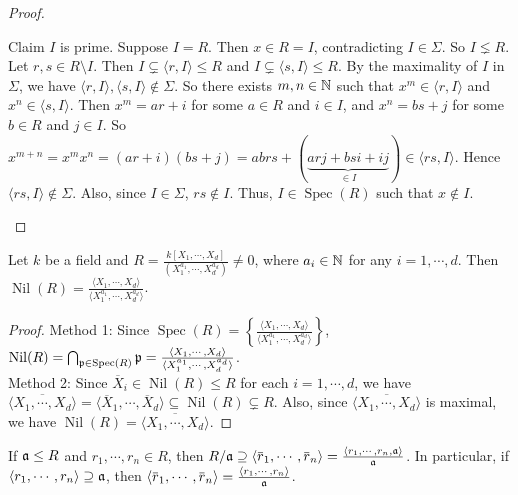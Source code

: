 \begin{proof}
\begin{enumerate}[(a)]
            Claim $I$ is prime. Suppose $I = R$. Then $x \in R = I$, contradicting $I \in \Sigma$. So $I \lneq R$. Let $r,s \in R \setminus I$. Then $I \subsetneq \langle r,I \rangle \leq R$ and $I \subsetneq \langle s,I \rangle \leq R$. By the maximality of $I$ in $\Sigma$, we have $\langle r,I \rangle, \langle s,I \rangle \not \in \Sigma$. So there exists $m,n \in \mathbb{N}$ such that $x^m \in \langle r,I \rangle$ and $x^n \in \langle s,I \rangle$. Then $x^m = ar+i$ for some $a \in R$ and $i \in I$, and $x^n = bs + j$ for some $b \in R$ and $j \in I$. So $x^{m+n} = x^m x^n = (ar+i)(bs+j) = abrs + (\underbrace{arj+bsi+ij}_{\in I}) \in \langle rs,I \rangle$. Hence $\langle rs, I \rangle \not\in \Sigma$. Also, since $I \in \Sigma$, $rs \not \in I$. Thus, $I \in \operatorname{Spec}(R)$ such that $x \not \in I$.
    \end{enumerate}
\end{proof}

\begin{example*}
    Let $k$ be a field and $R = \frac{k[X_1,\cdots,X_d]}{(X_1^{a_1},\cdots,X_d^{a_d})} \neq 0$, where $a_i \in \mathbb{N}$ for any $i = 1,\cdots,d$. Then $\operatorname{Nil}(R) = \frac{\langle X_1,\cdots,X_d \rangle}{\langle X_1^{a_1},\cdots,X_d^{a_d} \rangle}$.
\end{example*}

\begin{proof}
    Method 1: Since $\operatorname{Spec}(R) = \left\{\frac{\langle X_1,\cdots,X_d \rangle}{\langle X_1^{a_1},\cdots,X_d^{a_d} \rangle}\right\}$, $\operatorname{Nil}(R) = \bigcap_{\mathfrak{p} \in \operatorname{Spec}(R)} \mathfrak{p} =  \frac{\langle X_1,\cdots,X_d \rangle}{\langle X_1^{a_1},\cdots,X_d^{a_d} \rangle}$. \\
    Method 2: Since $\overbar X_i \in \operatorname{Nil}(R) \leq R$ for each $i = 1,\cdots,d$, we have $\overbar {\langle X_1,\cdots,X_d \rangle} = \langle \overbar X_1,\cdots,\overbar X_d \rangle \subseteq \operatorname{Nil}(R) \subsetneq R$. Also, since $\overbar {\langle X_1,\cdots,X_d \rangle}$ is maximal, we have $\operatorname{Nil}(R) = \overbar {\langle X_1,\cdots,X_d \rangle}$.
\end{proof}

\begin{fact*}
    If $\mathfrak{a} \leq R$ and $r_1,\cdots,r_n \in R$, then $R/\ffa \supseteq \langle \overbar r_1,\cdots,\overbar r_n \rangle = \frac{\langle r_1,\cdots,r_n, \ffa \rangle}{\ffa}$. In particular, if $\langle r_1,\cdots,r_n \rangle \supseteq \mathfrak{a}$, then $\langle \overbar r_1, \cdots, \overbar r_n \rangle = \frac{\langle r_1,\cdots,r_n \rangle}{\ffa}$.
\end{fact*}

